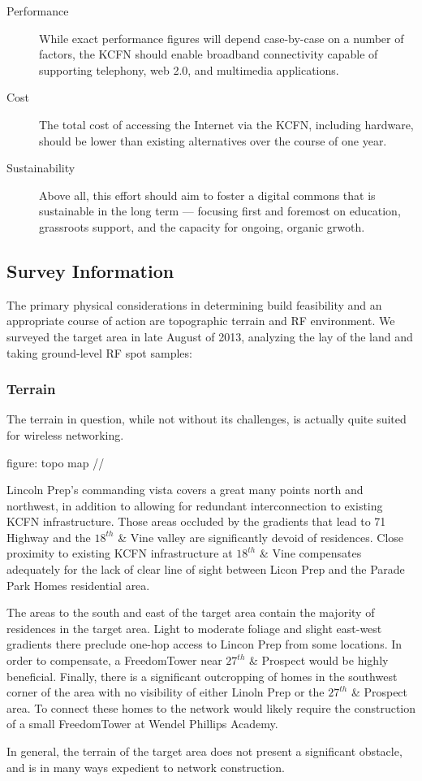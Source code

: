 \begin{description}
\item[Performance] While exact performance figures will depend case-by-case on a
number of factors, the KCFN should enable broadband connectivity capable of supporting
telephony, web 2.0, and multimedia applications.

\item[Cost] The total cost of
accessing the Internet via the KCFN, including hardware, should be lower than existing
alternatives over the course of one year.

\item[Sustainability] Above all, this effort should aim to foster a digital commons 
that is sustainable in the long term --- focusing first and foremost on education, grassroots
support, and the capacity for ongoing, organic grwoth.
\end{description}


\subsection{Survey Information}
The primary physical considerations in determining build feasibility and an
appropriate course of action are topographic terrain and RF environment. We
surveyed the target area in late August of 2013, analyzing the lay of the land
and taking ground-level RF spot samples: \par
\subsubsection{Terrain}
The terrain in question, while not without its challenges, is actually quite
suited for  wireless networking. \par
figure: topo map // \par
 Lincoln Prep's commanding vista covers
a great many points north and northwest, in addition to allowing for redundant
interconnection to existing KCFN infrastructure.  Those areas occluded by the
gradients that lead to 71 Highway and the $18^{th}$ \& Vine valley are
significantly devoid of residences.  Close proximity to
existing KCFN infrastructure at $18^{th}$ \& Vine compensates adequately for the
lack of clear line of sight  between Licon Prep and the Parade Park Homes
residential area. \par
The areas to the south and east of the target area contain the
majority of residences in the target area. Light to moderate foliage and slight
east-west gradients there preclude one-hop access to Lincon Prep from some
locations. In order to compensate, a FreedomTower near $27^{th}$ \& Prospect
would be highly beneficial.
Finally, there is a significant outcropping of homes in the southwest corner of
the area with no visibility of either Linoln Prep or the $27^{th}$ \& Prospect
area. To connect these homes to the network would likely require the
construction of a small FreedomTower at Wendel Phillips Academy. \par
In general, the terrain of the target area does not present a significant
obstacle, and is in many ways expedient to network construction. \par
